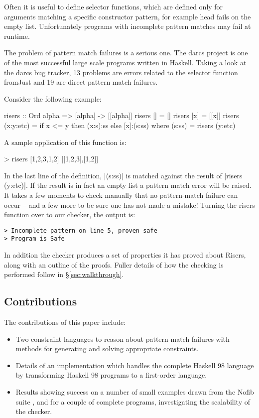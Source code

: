 \documentclass[preprint]{sigplanconf}
\newcommand{\C}[1]{\textsf{#1}}
\newenvironment{discuss}
    {\noindent\hspace{-1.5mm}\vline\hspace{1mm}\vline\hspace{1mm}\begin{minipage}[h]{\linewidth}}
    {\end{minipage}}
\begin{document}
\begin{discuss}
Often it is useful to define selector functions, which are defined only for arguments matching a specific constructor pattern, for example \C{head} fails on the empty list. Unfortunately programs with incomplete pattern matches may fail at runtime.
\end{discuss}

The problem of pattern match failures is a serious one. The darcs \citep{darcs} project is one of the most successful large scale programs written in Haskell. Taking a look at the darcs bug tracker, 13 problems are errors related to the selector function \C{fromJust} and 19 are direct pattern match failures.

Consider the following example:

\begin{code}
risers :: Ord alpha => [alpha] -> [[alpha]]
risers [] = []
risers [x] = [[x]]
risers (x:y:etc) = if x <= y then (x:s):ss else [x]:(s:ss)
    where (s:ss) = risers (y:etc)
\end{code}

A sample application of this function is:

\begin{code}
> risers [1,2,3,1,2]
[[1,2,3],[1,2]]
\end{code}

In the last line of the definition, |(s:ss)| is matched against the result of |risers (y:etc)|. If the result is in fact an empty list a pattern match error will be raised. It takes a few moments to check manually that no pattern-match failure can occur -- and a few more to be sure one has not made a mistake! Turning the \C{risers} function over to our checker, the output is:

\begin{verbatim}
> Incomplete pattern on line 5, proven safe
> Program is Safe
\end{verbatim}

In addition the checker produces a set of properties it has proved about Risers, along with an outline of the proofs. Fuller details of how the checking is performed follow in \S\ref{sec:walkthrough}.

\subsection{Contributions}

The contributions of this paper include:

\begin{itemize}
\item Two constraint languages to reason about pattern-match failures with methods for generating and solving appropriate constraints.
\item Details of an implementation which handles the complete Haskell 98 language \citep{haskell} by transforming Haskell 98 programs to a first-order language.
\item Results showing success on a number of small examples drawn from the Nofib suite \citep{nofib}, and for a couple of complete programs, investigating the scalability of the checker.
\end{itemize}
\end{document}
